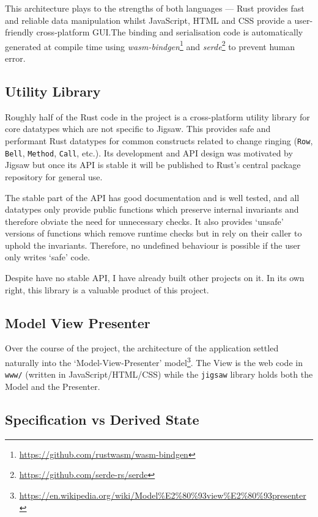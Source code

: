 \documentclass[12pt]{article}
\newcommand{\footurl}[1]{\footnote{\url{#1}}}
\begin{document}
This architecture plays to the strengths of both languages --- Rust provides fast and reliable data
manipulation whilst JavaScript, HTML and CSS provide a user-friendly cross-platform GUI.\@  The
binding and serialisation code is automatically generated at compile time using
\emph{wasm-bindgen}\footurl{https://github.com/rustwasm/wasm-bindgen} and
\emph{serde}\footurl{https://github.com/serde-rs/serde} to prevent human error.

\subsection{Utility Library}

Roughly half of the Rust code in the project is a cross-platform utility library for core datatypes
which are not specific to Jigsaw.  This provides safe and performant Rust datatypes for common
constructs related to change ringing (\verb|Row|, \verb|Bell|, \verb|Method|, \verb|Call|, etc.).
Its development and API design was motivated by Jigsaw but once its API is stable it will be
published to Rust's central package repository for general use.

The stable part of the API has good documentation and is well tested, and all datatypes only provide
public functions which preserve internal invariants and therefore obviate the need for unnecessary
checks.  It also provides `unsafe' versions of functions which remove runtime checks but in rely on
their caller to uphold the invariants.  Therefore, no undefined behaviour is possible if the user
only writes `safe' code.

Despite have no stable API, I have already built other projects on it.  In its own right, this
library is a valuable product of this project.

\subsection{Model View Presenter}

Over the course of the project, the architecture of the application settled naturally into the
`Model-View-Presenter'
model\footurl{https://en.wikipedia.org/wiki/Model\%E2\%80\%93view\%E2\%80\%93presenter}.  The View
is the web code in \verb|www/| (written in JavaScript/HTML/CSS) while the \verb|jigsaw| library
holds both the Model and the Presenter.

\subsection{Specification vs Derived State}
\end{document}

